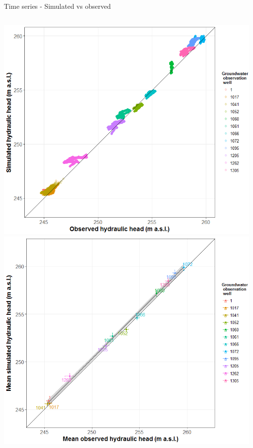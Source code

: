 \documentclass[8pt,ignorenonframetext,]{beamer}
\newcommand{\columnsbegin}{\begin{columns}}
\newcommand{\columnsend}{\end{columns}}
\begin{document}
\begin{frame}{Time series - Simulated vs observed}

\columnsbegin
{}
\includegraphics{imgPres/time_series_head_analysis02.png}
\includegraphics{imgPres/time_series_head_analysis03.png} \columnsend

\end{frame}
\end{document}
